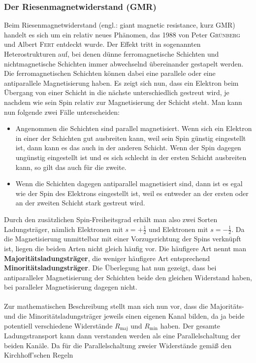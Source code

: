 \documentclass[german,  %
parskip=full,  %
]{scrartcl}
\begin{document}
\subsubsection{Der Riesenmagnetwiderstand (GMR)}
Beim Riesenmagnetwiderstand (engl.: giant magnetic resistance, kurz GMR) handelt es sich um ein relativ neues Phänomen, das 1988 von Peter \textsc{Grünberg} und Albert \textsc{Fert} entdeckt wurde. Der Effekt tritt in sogenannten Heterostrukturen auf, bei denen dünne ferromagnetische Schichten und nichtmagnetische Schichten immer abwechselnd übereinander gestapelt werden. Die ferromagnetischen Schichten können dabei eine parallele oder eine antiparallele Magnetisierung haben. Es zeigt sich nun, dass ein Elektron beim Übergang von einer Schicht in die nächste unterschiedlich gestreut wird, je nachdem wie sein Spin relativ zur Magnetisierung der Schicht steht. Man kann nun folgende zwei Fälle unterscheiden:
\begin{itemize}
\item Angenommen die Schichten sind parallel magnetisiert. Wenn sich ein Elektron in einer der Schichten gut ausbreiten kann, weil sein Spin günstig eingestellt ist, dann kann es das auch in der anderen Schicht. Wenn der Spin dagegen ungünstig eingestellt ist und es sich schlecht in der ersten Schicht ausbreiten kann, so gilt das auch für die zweite.
\item Wenn die Schichten dagegen antiparallel magnetisiert sind, dann ist es egal wie der Spin des Elektrons eingestellt ist, weil es entweder an der ersten oder an der zweiten Schicht stark gestreut wird.
\end{itemize}
Durch den zusätzlichen Spin-Freiheitsgrad erhält man also zwei Sorten Ladungsträger, nämlich Elektronen mit \(s=+\frac{1}{2}\) und Elektronen mit \(s= -\frac{1}{2}\). Da die Magnetisierung unmittelbar mit einer Vorzugsrichtung der Spins verknüpft ist, liegen die beiden Arten nicht gleich häufig vor. Die häufigere Art nennt man \textbf{Majoritätsladungsträger}, die weniger häufigere Art entsprechend \textbf{Minoritätsladungsträger}. Die Überlegung hat nun gezeigt, dass bei antiparalleler Magnetisierung der Schichten beide den gleichen Widerstand haben, bei paralleler Magnetisierung dagegen nicht. \\\\
Zur mathematischen Beschreibung stellt man sich nun vor, dass die Majoritäts- und die Minoritätsladungsträger jeweils einen eigenen Kanal bilden, da ja beide potentiell verschiedene Widerstände \(R_{\mathrm{maj}}\) und \(R_{\mathrm{min}}\) haben. Der gesamte Ladungstransport kann dann verstanden werden als eine Parallelschaltung der beiden Kanäle. Da für die Parallelschaltung zweier Widerstände gemäß den Kirchhoff'schen Regeln
\end{document}
